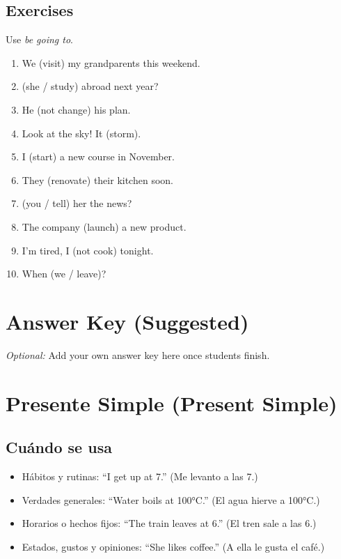 \documentclass[11pt,a4paper]{article}
\begin{document}
\subsection*{Exercises}
Use \emph{be going to}.
\begin{enumerate}
  \item We \underline{\hspace{2.5cm}} (visit) my grandparents this weekend.
  \item \underline{\hspace{2.5cm}} (she / study) abroad next year?
  \item He \underline{\hspace{2.5cm}} (not change) his plan.
  \item Look at the sky! It \underline{\hspace{2.5cm}} (storm).
  \item I \underline{\hspace{2.5cm}} (start) a new course in November.
  \item They \underline{\hspace{2.5cm}} (renovate) their kitchen soon.
  \item \underline{\hspace{2.5cm}} (you / tell) her the news?
  \item The company \underline{\hspace{2.5cm}} (launch) a new product.
  \item I’m tired, I \underline{\hspace{2.5cm}} (not cook) tonight.
  \item When \underline{\hspace{2.5cm}} (we / leave)?
\end{enumerate}

\section*{Answer Key (Suggested)}
\textit{Optional:} Add your own answer key here once students finish.
\newpage
\section{Presente Simple (Present Simple)}
\subsection*{Cuándo se usa}
\begin{itemize}
  \item Hábitos y rutinas: ``I get up at 7.'' (Me levanto a las 7.)
  \item Verdades generales: ``Water boils at 100°C.'' (El agua hierve a 100°C.)
  \item Horarios o hechos fijos: ``The train leaves at 6.'' (El tren sale a las 6.)
  \item Estados, gustos y opiniones: ``She likes coffee.'' (A ella le gusta el café.)
\end{itemize}
\end{document}
